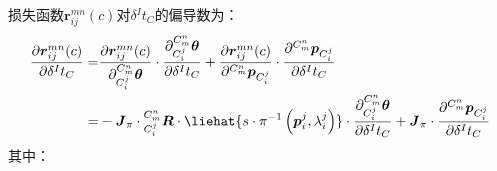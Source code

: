 损失函数$\boldsymbol{r}_{ij}^{mn}(c)$对$\delta{^{I}t_{C}}$的偏导数为：
\begin{equation}
  \label{equ:jacobian_tci}
  \begin{aligned}
    \frac{\partial \boldsymbol{r}_{ij}^{mn}(c)}{\partial \delta {^{I}t_{C}}}= &
    \frac{\partial \boldsymbol{r}_{ij}^{mn}(c)}{\partial  ^{C_m^n}_{C_i^j}\boldsymbol{\theta}}\cdot
    \frac{\partial ^{C_m^n}_{C_i^j}\boldsymbol{\theta}}{\partial \delta{^{I}t_{C}}}
    +
    \frac{\partial \boldsymbol{r}_{ij}^{mn}(c)}{\partial {^{C_m^n}\boldsymbol{p}_{C_i^j}}}\cdot
    \frac{\partial {^{C_m^n}\boldsymbol{p}_{C_i^j}}}{\partial \delta {^{I}t_{C}}}
    \\
    =                                                                         & -\boldsymbol{J}_{\pi}\cdot{{^{C_m^n}_{C_i^j}\boldsymbol{R}}\cdot\liehat{s \cdot\pi^{-1}\left(\boldsymbol{p}_i^j,\lambda_i^j\right)}}
    \cdot
    \frac{\partial ^{C_m^n}_{C_i^j}\boldsymbol{\theta}}{\partial \delta{^{I}t_{C}}}
    +
    \boldsymbol{J}_{\pi}\cdot\frac{\partial {^{C_m^n}\boldsymbol{p}_{C_i^j}}}{\partial \delta {^{I}t_{C}}}
  \end{aligned}
\end{equation}
其中：
